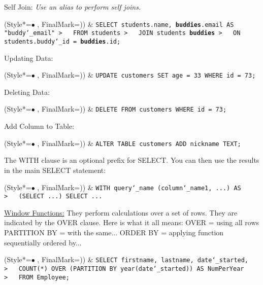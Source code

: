 \vspace{\baselineskip}
Self Join:\newline
\textit{Use an alias to perform self joins.}
\begin{easylist}[itemize]
\ListProperties(Style*=$\bullet$ , FinalMark={)})
& \texttt{SELECT students.name, \textbf{buddies}.email AS "buddy\char`_email"\newline
>~~~FROM students\newline
>~~~JOIN students \textbf{buddies}\newline
>~~~ON students.buddy\char`_id = \textbf{buddies}.id;}
\end{easylist}

\newpage
Updating Data:
\begin{easylist}[itemize]
\ListProperties(Style*=$\bullet$ , FinalMark={)})
& \texttt{UPDATE customers SET age = 33 WHERE id = 73;}
\end{easylist}

\vspace{\baselineskip}
Deleting Data:
\begin{easylist}[itemize]
\ListProperties(Style*=$\bullet$ , FinalMark={)})
& \texttt{DELETE FROM customers WHERE id = 73;}
\end{easylist}

\vspace{\baselineskip}
Add Column to Table:
\begin{easylist}[itemize]
\ListProperties(Style*=$\bullet$ , FinalMark={)})
& \texttt{ALTER TABLE customers ADD nickname TEXT;}
\end{easylist}

\vspace{\baselineskip}
The WITH clause is an optional prefix for SELECT.
You can then use the results in the main SELECT statement:
\begin{easylist}[itemize]
\ListProperties(Style*=$\bullet$ , FinalMark={)})
& \texttt{WITH query\char`_name (column\char`_name1, ...) AS\newline
>~~~(SELECT ...)\newline
SELECT ...}
\end{easylist}

\vspace{\baselineskip}
\underline{Window Functions:}\newline
They perform calculations over a set of rows.
They are indicated by the OVER clause.\newline
\newline
Here is what it all means:\newline
OVER = using all rows\newline
PARTITION BY = with the same...\newline
ORDER BY = applying function sequentially ordered by...
% 
\begin{easylist}[itemize]
\ListProperties(Style*=$\bullet$ , FinalMark={)})
& \texttt{SELECT firstname, lastname, date\char`_started,\newline
>~~~COUNT(*) OVER (PARTITION BY year(date\char`_started)) AS NumPerYear\newline
>~~~FROM Employee;}
\end{easylist}

\newpage
